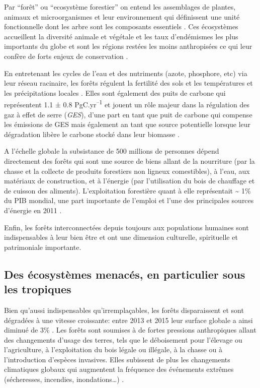 \documentclass[
  11pt,
  french,
  A4paper,
  extrafontsizes,onecolumn,openright
  ]{memoir}
\begin{document}
Par ``forêt'' ou ``ecosystème forestier'' on entend les assemblages de
plantes, animaux et microorganismes et leur environnement qui
définissent une unité fonctionnelle dont les arbre sont les composants
essentiels \autocite{FRA2000}. Ces écosystèmes accueillent la diversité
animale et végétale et les taux d'endémismes les plus importants du
globe et sont les régions restées les moins anthropisées ce qui leur
confère de forts enjeux de conservation
\autocites{Myers2000}{Mittermeier2003}.

En entretenant les cycles de l'eau et des nutriments (azote, phosphore,
etc) via leur réseau racinaire, les forêts régulent la fertilité des
sols et les températures et les précipitations locales
\autocites{Malhi2008}{Isbell2017}. Elles sont également des puits de
carbone qui représentent 1.1 ± 0.8 PgC.yr\textsuperscript{--1} et jouent
un rôle majeur dans la régulation des gaz à effet de serre (\emph{GES}),
d'une part en tant que puit de carbone qui compense les émissions de GES
mais également an tant que source potentielle lorsque leur dégradation
libère le carbone stocké dans leur biomasse
\autocites{Pan2011}{Roy2017}.

A l'échelle globale la subsistance de 500 millions de personnes dépend
directement des forêts qui sont une source de biens allant de la
nourriture (par la chasse et la collecte de produits forestiers non
ligneux comestibles), à l'eau, aux matériaux de construction, et à
l'énergie (par l'utilisation du bois de chauffage et de cuisson des
aliments). L'exploitation forestière quant à elle représentait
\textasciitilde{} 1\% du PIB mondial, une part importante de l'emploi et
l'une des principales sources d'énergie en 2011
\autocites{CBDdiversity2011}{FAO2014}.

Enfin, les forêts interconnectées depuis toujours aux populations
humaines sont indispensables à leur bien être et ont une dimension
culturelle, spirituelle et patrimoniale importante.

\subsection{Des écosystèmes menacés, en particulier sous les
tropiques}\label{des-ecosystemes-menaces-en-particulier-sous-les-tropiques}

Bien qu'aussi indispensables qu'irremplaçables, les forêts disparaissent
et sont dégradées à une vitesse croissante: entre 2013 et 2015 leur
surface globale a ainsi diminué de 3\% \autocite{FAO2009}. Les forêts
sont soumises à de fortes pressions anthropiques allant des changements
d'usage des terres, tels que le déboisement pour l'élevage ou
l'agriculture, à l'exploitation du bois légale ou illégale, à la chasse
ou à l'introduction d'espèces invasives. Elles subissent de plus les
changements climatiques globaux qui augmentent la fréquence des
événements extrêmes (sécheresses, incendies, inondations\ldots{})
\autocite{Pachauri2014}.
\end{document}

